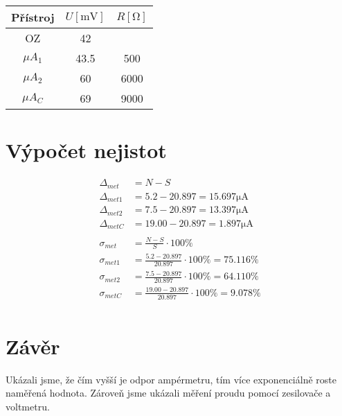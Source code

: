\documentclass{article}
\begin{document}
	\begin{tabular}{c||c|c}
		Přístroj & $U [\si{\milli\volt}]$ & $R [\si{\ohm}]$ \\ \hline \hline
		OZ & 42 & \\ \hline
		$\mu A_1$ & 43.5 & 500 \\ \hline
		$\mu A_2$ & 60 & 6000 \\ \hline
		$\mu A_C$ & 69 & 9000
	\end{tabular}
	
	\section{Výpočet nejistot}
	$$
	\begin{aligned}
		\Delta_{met}&=N-S\\
		\Delta_{met1}&=5.2-20.897=15.697\si{\micro\ampere}\\
		\Delta_{met2}&=7.5-20.897=13.397\si{\micro\ampere}\\
		\Delta_{metC}&=19.00-20.897=1.897\si{\micro\ampere}\\
		\\
		\sigma_{met}&=\frac{N-S}{S} \cdot 100\%\\
		\sigma_{met1}&=\frac{5.2-20.897}{20.897} \cdot 100\% = 75.116\%\\
		\sigma_{met2}&=\frac{7.5-20.897}{20.897} \cdot 100\% = 64.110\%\\
		\sigma_{metC}&=\frac{19.00-20.897}{20.897} \cdot 100\% = 9.078\%\\
	\end{aligned}
	$$
	\section{Závěr}
	Ukázali jsme, že čím vyšší je odpor ampérmetru, tím více exponenciálně roste naměřená hodnota. Zároveň jsme ukázali měření proudu pomocí zesilovače a voltmetru.
\end{document}
